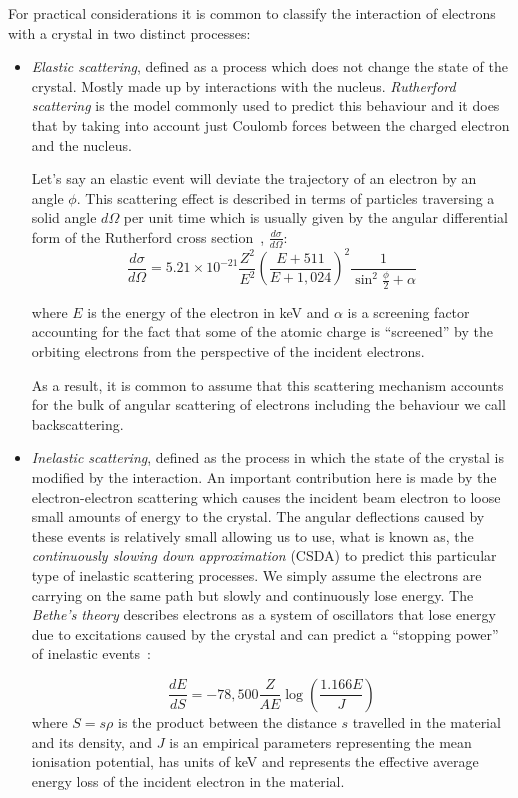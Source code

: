 For practical considerations it is common to classify the interaction of electrons with a crystal in two distinct processes:
\begin{itemize}
\item \textit{Elastic scattering}, defined as a process which does not change the state of the crystal. Mostly made up by interactions with the nucleus. \textit{Rutherford scattering} is the model commonly used to predict this behaviour and it does that by taking into account just Coulomb forces between the charged electron and the nucleus. 

Let's say an elastic event will deviate the trajectory of an electron by an angle $\phi$. This scattering effect is described in terms of particles traversing a solid angle $d\Omega$ per unit time which is usually given by the angular differential form of the Rutherford cross section~\cite{Reimer76}, $\frac{d \sigma}{d \Omega}$:
\begin{equation*}
\frac{d \sigma}{d \Omega} = 5.21 \times 10^{-21} \frac{Z^2}{E^2} \left(\frac{E+511}{E+1,024}\right)^2 \frac{1}{\sin^2{\frac{\phi}{2}} + \alpha}
\end{equation*}

where $E$ is the energy of the electron in keV and $\alpha$ is a screening factor accounting for the fact that some of the atomic charge is ``screened'' by the orbiting electrons from the perspective of the incident electrons.

As a result, it is common to assume that this scattering mechanism accounts for  the bulk of angular scattering of electrons including the behaviour we call backscattering.


\item \textit{Inelastic scattering}, defined as the process in which the state of the crystal is modified by the interaction. An important contribution here is made by the electron-electron scattering which causes the incident beam electron to loose small amounts of energy to the crystal. The angular deflections caused by these events is relatively small allowing us to use, what is known as, the \textit{continuously slowing down approximation} (CSDA) to  predict this particular type of inelastic scattering processes. We simply assume the electrons are carrying on the same path but slowly and continuously lose energy. The \textit{Bethe's theory} describes electrons as a system of oscillators that lose energy due to excitations caused by the crystal and can predict a ``stopping power'' of inelastic events~\cite{joy1989}:

\begin{equation*}
    \frac{dE}{dS} = -78,500 \frac{Z}{A E} \log{\left( \frac{1.166E}{J}\right)}
\end{equation*}
where $S= s \rho$ is the product between the distance $s$ travelled in the material and its density,  and $J$ is an empirical parameters representing the mean ionisation potential, has units of keV and represents the effective average energy loss of the incident electron in the material. 
\end{itemize}


